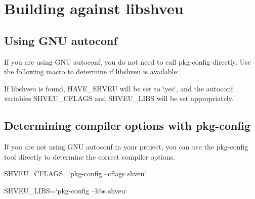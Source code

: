 \section{Building against libshveu}
\label{group__building}
\subsection{Using GNU autoconf}\label{group__building_autoconf}
If you are using GNU autoconf, you do not need to call pkg-\/config directly. Use the following macro to determine if libshveu is available:




If libshveu is found, HAVE\_\-SHVEU will be set to \char`\"{}yes\char`\"{}, and the autoconf variables SHVEU\_\-CFLAGS and SHVEU\_\-LIBS will be set appropriately.\subsection{Determining compiler options with pkg-\/config}\label{group__building_pkg-config}
If you are not using GNU autoconf in your project, you can use the pkg-\/config tool directly to determine the correct compiler options.


\begin{DoxyPre}
 SHVEU\_CFLAGS=`pkg-config --cflags shveu`\end{DoxyPre}



\begin{DoxyPre} SHVEU\_LIBS=`pkg-config --libs shveu`
 \end{DoxyPre}
 